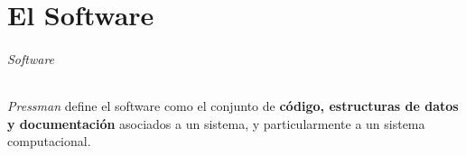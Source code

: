 \part{El Software}
\paragraph{Software}
\textit{Pressman} define el software como el conjunto de \textbf{código, estructuras de datos y documentación} asociados a un sistema, y particularmente a un sistema computacional.

